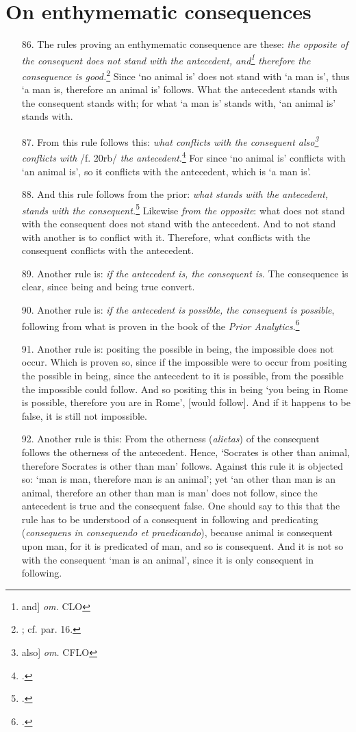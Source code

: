 \section{On enthymematic consequences}
\begin{itemize}
\item[86.] The rules proving an enthymematic consequence are these: \textit{the opposite of the consequent does not stand with the antecedent, and\footnote{and] \textit{om.} CLO} therefore the consequence is good.}\footnote{\cite[64.1]{BurleyDPAL}; cf. par. 16.} Since `no animal is' does not stand with `a man is', thus `a man is, therefore an animal is' follows. What the antecedent stands with the consequent stands with; for what `a man is' stands with, `an animal is' stands with.
\item[87.] From this rule follows this: \textit{what conflicts with the consequent also\footnote{also] \textit{om.} CFLO} conflicts with} /f. 20rb/ \textit{the antecedent}.\footnote{\cite[p. 63.1]{BurleyDPAL}.} For since `no animal is' conflicts with `an animal is', so it conflicts with the antecedent, which is `a man is'.
\item[88.] And this rule follows from the prior: \textit{what stands with the antecedent, stands with the consequent.}\footnote{\cite[p. 63.7]{BurleyDPAL}.} Likewise \textit{from the opposite}: what does not stand with the consequent does not stand with the antecedent. And to not stand with another is to conflict with it. Therefore, what conflicts with the consequent conflicts with the antecedent.
\item[89.] Another rule is: \textit{if the antecedent is, the consequent is}. The consequence is clear, since being and being true convert.
\item[90.] Another rule is: \textit{if the antecedent is possible, the consequent is possible}, following from what is proven in the book of the \textit{Prior Analytics}.\footnote{\cite[I, 13, p. 32b.26]{AristotlePrA}.}
\item[91.] Another rule is: positing the possible in being, the impossible does not occur. Which is proven so, since if the impossible were to occur from positing the possible in being, since the antecedent to it is possible, from the possible the impossible could follow. And so positing this in being `you being in Rome is possible, therefore you are in Rome', [would follow]. And if it happens to be false, it is still not impossible.
\item[92.] Another rule is this: From the otherness (\textit{alietas}) of the consequent follows the otherness of the antecedent. Hence, `Socrates is other than animal, therefore Socrates is other than man' follows. Against this rule it is objected so: `man is man, therefore man is an animal'; yet `an other than man is an animal, therefore an other than man is man' does not follow, since the antecedent is true and the consequent false. One should say to this that the rule has to be understood of a consequent in following and predicating (\textit{consequens in consequendo et praedicando}), because animal is consequent upon man, for it is predicated of man, and so is consequent. And it is not so with the consequent `man is an animal', since it is only consequent in following.

\end{itemize}

